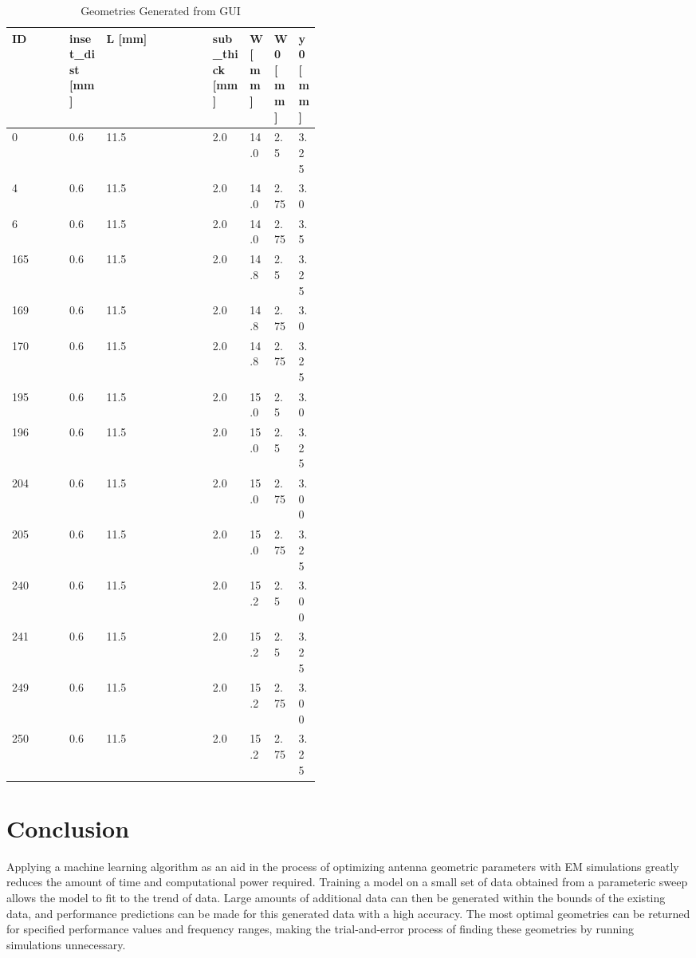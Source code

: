 \documentclass[conference]{IEEEtran}
\begin{document}
\begin{table}[h]
\caption{Geometries Generated from GUI}
\begin{center}
\begin{tabular}{ |l|p{0.12\linewidth}|l|p{0.12\linewidth}|p{0.07\linewidth}|p{0.07\linewidth}|p{0.07\linewidth}| }
    \hline
    ID & inset\_dist [mm] & L [mm] & sub\_thick [mm] & W [mm] & W0 [mm] & y0 [mm] \\ 
    \hline
    0 & 0.6 & 11.5 & 2.0 & 14.0 & 2.5 & 3.25 \\
    \hline
    4 & 0.6 & 11.5 & 2.0 & 14.0 & 2.75 & 3.0 \\
    \hline
    6 & 0.6 & 11.5 & 2.0 & 14.0 & 2.75 & 3.5 \\
    \hline
    165 & 0.6 & 11.5 & 2.0 & 14.8 & 2.5 & 3.25 \\
    \hline
    169 & 0.6 & 11.5 & 2.0 & 14.8 & 2.75 & 3.0 \\
    \hline
    170 & 0.6 & 11.5 & 2.0 & 14.8 & 2.75 & 3.25 \\
    \hline
    195 & 0.6 & 11.5 & 2.0 & 15.0 & 2.5 & 3.0 \\
    \hline
    196 & 0.6 & 11.5 & 2.0 & 15.0 & 2.5 & 3.25 \\
    \hline
    204 & 0.6 & 11.5 & 2.0 & 15.0 & 2.75 & 3.00 \\
    \hline
    205 & 0.6 & 11.5 & 2.0 & 15.0 & 2.75 & 3.25 \\
    \hline
    240 & 0.6 & 11.5 & 2.0 & 15.2 & 2.5 & 3.00 \\
    \hline
    241 & 0.6 & 11.5 & 2.0 & 15.2 & 2.5 & 3.25 \\
    \hline
    249 & 0.6 & 11.5 & 2.0 & 15.2 & 2.75 & 3.00 \\
    \hline
    250 & 0.6 & 11.5 & 2.0 & 15.2 & 2.75 & 3.25 \\
    \hline
\end{tabular}
\end{center}
\label{gui_geometries}
\end{table}    
    

\section{Conclusion}
Applying a machine learning algorithm as an aid in the process of optimizing antenna geometric parameters with EM simulations greatly reduces the amount of time and computational power required. Training a model on a small set of data obtained from a parameteric sweep allows the model to fit to the trend of data. Large amounts of additional data can then be generated within the bounds of the existing data, and performance predictions can be made for this generated data with a high accuracy. The most optimal geometries can be returned for specified performance values and frequency ranges, making the trial-and-error process of finding these geometries by running simulations unnecessary. 




\vfill
\end{document}
